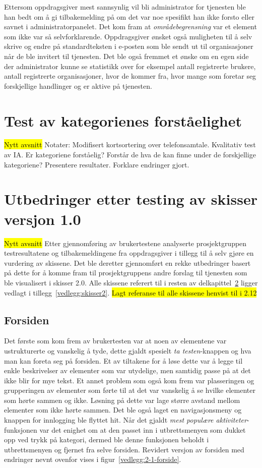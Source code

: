 Ettersom oppdragsgiver mest sannsynlig vil bli administrator for tjenesten ble han bedt om å gi tilbakemelding på om det var noe spesifikt han ikke forsto eller savnet i administratorpanelet. Det kom fram at {\em områdebegrensning} var et element som ikke var så selvforklarende. Oppdragsgiver ønsket også muligheten til å selv skrive og endre på standardteksten i e-posten som ble sendt ut til organisasjoner når de ble invitert til tjenesten. Det ble også fremmet et ønske om en egen side der administrator kunne se statistikk over for eksempel antall registrerte brukere, antall registrerte organisasjoner, hvor de kommer fra, hvor mange som foretar seg forskjellige handlinger og er aktive på tjenesten.

\section{Test av kategorienes forståelighet}
\hl{Nytt avsnitt}
Notater:
Modifisert kortsortering over telefonsamtale.
Kvalitativ test av IA.
Er kategoriene forståelig? Forstår de hva de kan finne under de forskjellige kategoriene?
Presentere resultater.
Forklare endringer gjort.

\section{Utbedringer etter testing av skisser versjon 1.0}
\label{section:utbedringer-skisser-1}
\hl{Nytt avsnitt}
Etter gjennomføring av brukertestene analyserte prosjektgruppen testresultatene og tilbakemeldingene fra oppdragsgiver i tillegg til å selv gjøre en vurdering av skissene. Det ble deretter gjennomført en rekke utbedringer basert på dette for å komme fram til prosjektgruppens andre forslag til tjenesten som ble visualisert i skisser 2.0. Alle skissene referert til i resten av delkapittel~\ref{section:utbedringer-skisser-1} ligger vedlagt i tillegg~\ref{vedlegg:skisser2}.
\hl{Lagt referanse til alle skissene henvist til i 2.12}

\subsection{Forsiden}

Det første som kom frem av brukertesten var at noen av elementene var ustrukturerte og vanskelig å tyde, dette gjaldt spesielt {\em ta testen}-knappen og hva man kan foreta seg på forsiden. Et av tiltakene for å løse dette var å legge til enkle beskrivelser av elementer som var utydelige, men samtidig passe på at det ikke blir for mye tekst. Et annet problem som også kom frem var plasseringen og grupperingen av elementer som førte til at det var vanskelig å se hvilke elementer som hørte sammen og ikke. Løsning på dette var lage større avstand mellom elementer som ikke hørte sammen. Det ble også laget en navigasjonsmeny og knappen for innlogging ble flyttet hit. Når det gjaldt {\em mest populære aktiviteter}-funksjonen var det enighet om at den passet inn i utbrettsmenyen som dukket opp ved trykk på kategori, dermed ble denne funksjonen beholdt i utbrettsmenyen og fjernet fra selve forsiden. Revidert versjon av forsiden med endringer nevnt ovenfor vises i figur~\ref{vedlegg:2-1-forside}.

